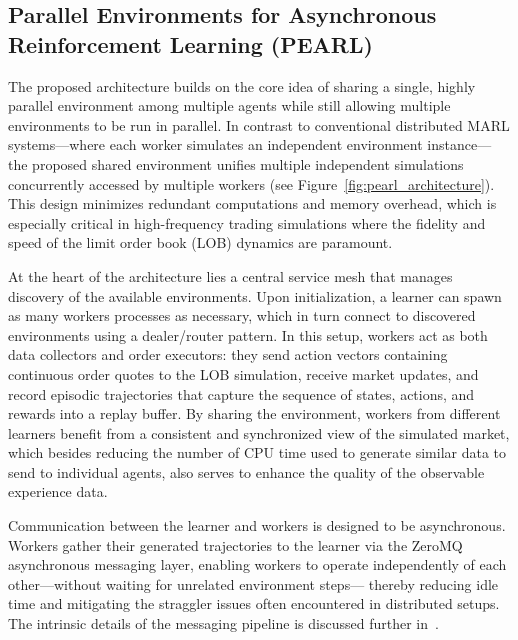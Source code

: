 

    \subsection{Parallel Environments for Asynchronous Reinforcement Learning (PEARL)}
    \label{subsec:pearl}
    The proposed architecture builds on the core idea of sharing a single, highly parallel environment among multiple agents while
    still allowing multiple environments to be run in parallel.
    In contrast to conventional distributed MARL systems—where each worker simulates an independent environment instance—
    the proposed shared environment unifies multiple independent simulations concurrently accessed by multiple workers
    (see Figure~\ref{fig:pearl_architecture}).
    This design minimizes redundant computations and memory overhead,
    which is especially critical in high-frequency trading simulations where the fidelity and speed of the limit order book (LOB) dynamics are paramount.

    At the heart of the architecture lies a central service mesh that manages discovery of the available environments.
    Upon initialization, a learner can spawn as many workers processes as necessary,
    which in turn connect to discovered environments using a dealer/router pattern.
    In this setup, workers act as both data collectors and order executors:
    they send action vectors containing continuous order quotes to the LOB simulation,
    receive market updates, and record episodic trajectories that capture the sequence of states, actions, and rewards into a replay buffer.
    By sharing the environment, workers from different learners benefit from a consistent and synchronized view of the simulated market,
    which besides reducing the number of CPU time used to generate similar data to send to individual agents,
    also serves to enhance the quality of the observable experience data.

    Communication between the learner and workers is designed to be asynchronous.
    Workers gather their generated trajectories to the learner via the ZeroMQ asynchronous messaging layer,
    enabling workers to operate independently of each other—without waiting for unrelated environment steps—
    thereby reducing idle time and mitigating the straggler issues often encountered in distributed setups.
    The intrinsic details of the messaging pipeline is discussed further in~.

